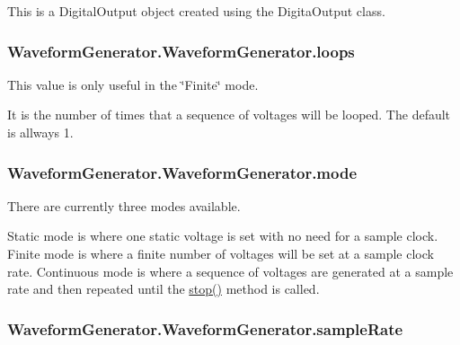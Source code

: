 This is a Digital\-Output object created using the Digita\-Output class. 

\hypertarget{class_waveform_generator_1_1_waveform_generator_aa36d19f0d2c8700947394d01b6b4621a}{
\subsubsection[{loops}]{\setlength{\rightskip}{0pt plus 5cm}Waveform\-Generator.\-Waveform\-Generator.\-loops}}\label{class_waveform_generator_1_1_waveform_generator_aa36d19f0d2c8700947394d01b6b4621a}


This value is only useful in the \char`\"{}\-Finite\char`\"{} mode. 

It is the number of times that a sequence of voltages will be looped. The default is allways 1. \hypertarget{class_waveform_generator_1_1_waveform_generator_ab11b448ff5baf7c87021af3cddfa49d0}{
\subsubsection[{mode}]{\setlength{\rightskip}{0pt plus 5cm}Waveform\-Generator.\-Waveform\-Generator.\-mode}}\label{class_waveform_generator_1_1_waveform_generator_ab11b448ff5baf7c87021af3cddfa49d0}


There are currently three modes available. 

Static mode is where one static voltage is set with no need for a sample clock. Finite mode is where a finite number of voltages will be set at a sample clock rate. Continuous mode is where a sequence of voltages are generated at a sample rate and then repeated until the \hyperlink{class_waveform_generator_1_1_waveform_generator_a4e22f830e0cded02a876561c6397de0d}{stop()} method is called. \hypertarget{class_waveform_generator_1_1_waveform_generator_a7f6803ac26eaa8fd4e1880a39c15ca5f}{
\subsubsection[{sample\-Rate}]{\setlength{\rightskip}{0pt plus 5cm}Waveform\-Generator.\-Waveform\-Generator.\-sample\-Rate}}\label{class_waveform_generator_1_1_waveform_generator_a7f6803ac26eaa8fd4e1880a39c15ca5f}


